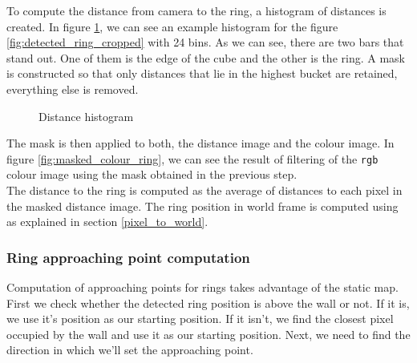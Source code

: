 \documentclass[12pt,a4paper]{article}
\begin{document}
	To compute the distance from camera to the ring, a histogram of distances is created. In figure \ref{fig:distance_histogram}, we can see an example histogram for the figure \ref{fig:detected_ring_cropped} with 24 bins. As we can see, there are two bars that stand out. One of them is the edge of the cube and the other is the ring. A mask is constructed so that only distances that lie in the highest bucket are retained, everything else is removed. \\
	
	\begin{figure}[H]
		\centering
		\caption{Distance histogram}
		\label{fig:distance_histogram}
	\end{figure}

	The mask is then applied to both, the distance image and the colour image. In figure \ref{fig:masked_colour_ring}, we can see the result of filtering of the \texttt{rgb} colour image using the mask obtained in the previous step. \\

	The distance to the ring is computed as the average of distances to each pixel in the masked distance image. The ring position in world frame is computed using as explained in section \ref{pixel_to_world}. \\

	\subsubsection{Ring approaching point computation}
	Computation of approaching points for rings takes advantage of the static map. First we check whether the detected ring position is above the wall or not. If it is, we use it's position as our starting position. If it isn't, we find the closest pixel occupied by the wall and use it as our starting position. Next, we need to find the direction in which we'll set the approaching point. \\
\end{document}
